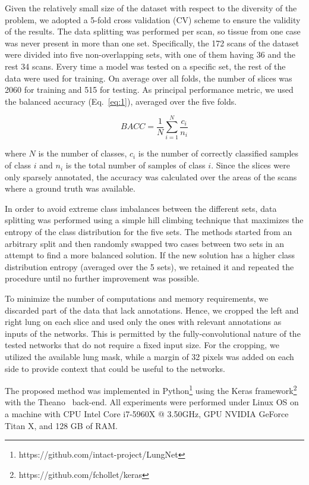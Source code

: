 \documentclass[journal]{IEEEtran}
\begin{document}
Given the relatively small size of the dataset with respect to the diversity of the problem, we adopted a 5-fold cross validation (CV) scheme to ensure the validity of the results. The data splitting was performed per scan, so tissue from one case was never present in more than one set. Specifically, the 172 scans of the dataset were divided into five non-overlapping sets, with one of them having 36 and the rest 34 scans. Every time a model was tested on a specific set, the rest of the data were used for training. On average over all folds, the number of slices was 2060 for training and 515 for testing. As principal performance metric, we used the balanced accuracy (Eq.~\ref{eq:1}), averaged over the five folds.

\begin{equation}\label{eq:1}
BACC = \frac{1}{N}\sum_{i=1}^{N}\frac{c_i}{n_i}
\end{equation}

where $N$ is the number of classes, $c_i$ is the number of correctly classified samples of class $i$ and $n_i$ is the total number of samples of class $i$. Since the slices were only sparsely annotated, the accuracy was calculated over the areas of the scans where a ground truth was available. 

In order to avoid extreme class imbalances between the different sets, data splitting was performed using a simple hill climbing technique that maximizes the entropy of the class distribution for the five sets. The methods started from an arbitrary split and then randomly swapped two cases between two sets in an attempt to find a more balanced solution. If the new solution has a higher class distribution entropy (averaged over the 5 sets), we retained it and repeated the procedure until no further improvement was possible.

To minimize the number of computations and memory requirements, we discarded part of the data that lack annotations. Hence, we cropped the left and right lung on each slice and used only the ones with relevant annotations as inputs of the networks. This is permitted by the fully-convolutional nature of the tested networks that do not require a fixed input size. For the cropping, we utilized the available lung mask, while a margin of 32 pixels was added on each side to provide context that could be useful to the networks. 

The proposed method was implemented in Python\footnote{https://github.com/intact-project/LungNet} using the Keras framework\footnote{https://github.com/fchollet/keras} with the Theano~\cite{theano} back-end. All experiments were performed under Linux OS on a machine with CPU Intel Core i7-5960X @ 3.50GHz, GPU NVIDIA GeForce Titan X, and 128 GB of RAM.
\end{document}
